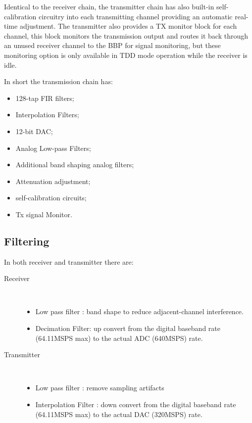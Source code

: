 Identical to the receiver chain, the transmitter chain has also built-in self-calibration circuitry into each transmitting channel providing an automatic real-time adjustment. The transmitter also provides a TX monitor block for each channel, this block monitors the transmission output and routes it back through an unused receiver channel to the BBP for signal monitoring, but these monitoring option is only available in TDD mode operation while the receiver is idle.

In short the transmission chain has:

\begin{itemize}
	\item 128-tap FIR filters;
	\item Interpolation Filters;
	\item 12-bit DAC;
	\item Analog Low-pass Filters;
	\item Additional band shaping analog filters;
	\item Attenuation adjustment;
	\item self-calibration circuits;
	\item Tx signal Monitor.
\end{itemize}


\subsection{Filtering}

In both receiver and transmitter there are:
\begin{description}
	\item[Receiver] \hfill \\
	\begin{itemize}
		\item Low pass filter : band shape to reduce adjacent-channel interference.
		\item Decimation Filter: up convert from the digital baseband rate (64.11MSPS max) to the actual ADC (640MSPS) rate.
	\end{itemize}
	\item[Transmitter] \hfill \\
\begin{itemize}
		\item Low pass filter : remove sampling artifacts
		\item Interpolation Filter : down convert from the digital baseband rate (64.11MSPS max) to the actual DAC (320MSPS) rate.
	\end{itemize}
\end{description}

